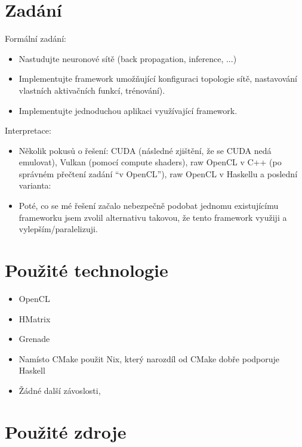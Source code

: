 \documentclass[11pt,a4paper]{article}
\begin{document}
\titlepageandcontents

\section{Zadání}

Formální zadání:
\begin{itemize}
  \item Nastudujte neuronové sítě (back propagation, inference, ...)
  \item Implementujte framework umožňující konfiguraci topologie sítě, nastavování vlastních aktivačních funkcí, trénování).
  \item Implementujte jednoduchou aplikaci využívající framework.
\end{itemize}

Interpretace:

\begin{itemize}
\item Několik pokusů o řešení: CUDA (následné zjištění, že se CUDA nedá
  emulovat), Vulkan (pomocí compute shaders), raw OpenCL v C++ (po správném
  přečtení zadání ``v OpenCL''), raw OpenCL v Haskellu a poslední varianta:
\item Poté, co se mé řešení začalo nebezpečně podobat jednomu existujícímu
  frameworku jsem zvolil alternativu takovou, že tento framework využiji a
  vylepším/paralelizuji.
\end{itemize}

\section{Použité technologie}

\begin{itemize}
  \item OpenCL
  \item HMatrix
  \item Grenade
    \\
  \item Namísto CMake použit Nix, který narozdíl od CMake dobře podporuje Haskell
  \item Žádné další závoslosti,
\end{itemize}

\section{Použité zdroje}
\end{document}
